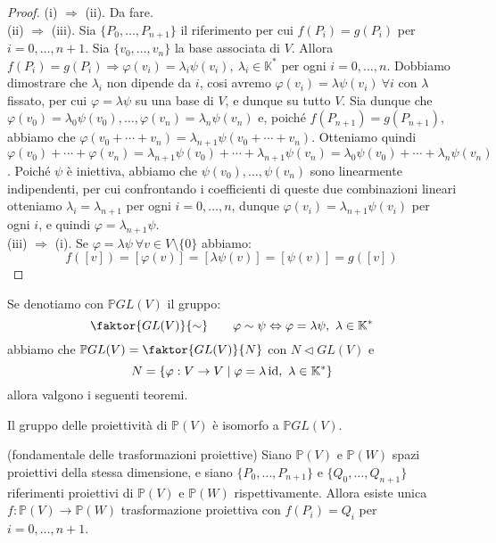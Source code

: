 \begin{proof}
(i) $\Rightarrow$ (ii). Da fare.\\
(ii) $\Rightarrow$ (iii). Sia $\{P_0,\dots,P_{n+1}\}$ il riferimento per cui $f(P_i)=g(P_i)$ per $i=0,\dots,n+1$. Sia $\{v_0,\dots,v_n\}$ la base associata di $V$. Allora $f(P_i)=g(P_i) \Rightarrow \varphi (v_i) =\lambda _i \psi (v_i),\ \lambda _i \in \mathbb{K}^*$ per ogni $i=0,\dots,n$. Dobbiamo dimostrare che $\lambda _i$ non dipende da $i$, cosi avremo $\varphi (v_i)=\lambda \psi (v_i)\ \forall i$ con $\lambda$ fissato, per cui $\varphi =\lambda \psi$ su una base di $V$, e dunque su tutto $V$. Sia dunque che $\varphi (v_0)=\lambda _0 \psi (v_0),\dots, \varphi (v_n)=\lambda _n \psi (v_n)$ e, poiché $f(P_{n+1})=g(P_{n+1})$, abbiamo che $\varphi (v_0+\cdots+v_n)=\lambda _{n+1} \psi (v_0+\cdots+v_n)$. Otteniamo quindi $\varphi (v_0)+\cdots+\varphi (v_n)=\lambda _{n+1} \psi (v_0)+\cdots+\lambda _{n+1} \psi (v_n)=\lambda _0 \psi (v_0)+\cdots+\lambda _n \psi (v_n)$. Poiché $\psi$ è iniettiva, abbiamo che $\psi (v_0),\dots,\psi (v_n)$ sono linearmente indipendenti, per cui confrontando i coefficienti di queste due combinazioni lineari otteniamo $\lambda _i=\lambda _{n+1}$ per ogni $i=0,\dots,n$, dunque $\varphi (v_i)=\lambda _{n+1} \psi (v_i)$ per ogni $i$, e quindi $\varphi =\lambda _{n+1} \psi$.\\
(iii) $\Rightarrow$ (i). Se $\varphi =\lambda \psi\ \forall v \in V\setminus \{0\}$ abbiamo:
$$f([v])=[\varphi (v)]=[\lambda \psi (v)]=[\psi (v)]=g([v])$$
\end{proof}

Se denotiamo con $\mathbb{P}GL(V)$ il gruppo:
$$\faktor{GL(V)}{\sim} \qquad \varphi \sim \psi \Leftrightarrow \varphi=\lambda \psi,\ \lambda \in \mathbb{K}^*$$
abbiamo che $\mathbb{P}GL(V)=\faktor{GL(V)}{N}$ con $N \triangleleft GL(V)$ e
$$N=\{\varphi :V \rightarrow V \mid \varphi =\lambda \operatorname{id},\ \lambda \in \mathbb{K}^*\}$$
allora valgono i seguenti teoremi.

\begin{thm}
Il gruppo delle proiettività di $\mathbb{P}(V)$ è isomorfo a $\mathbb{P}GL(V)$.
\end{thm}

\begin{thm}
(fondamentale delle trasformazioni proiettive) Siano $\mathbb{P}(V)$ e $\mathbb{P}(W)$ spazi proiettivi della stessa dimensione, e siano $\{P_0,\dots,P_{n+1}\}$ e $\{Q_0,\dots,Q_{n+1}\}$ riferimenti proiettivi di $\mathbb{P}(V)$ e $\mathbb{P}(W)$ rispettivamente. Allora esiste unica $f:\mathbb{P}(V) \rightarrow \mathbb{P}(W)$ trasformazione proiettiva con $f(P_i)=Q_i$ per $i=0,\dots,n+1$.
\end{thm}

